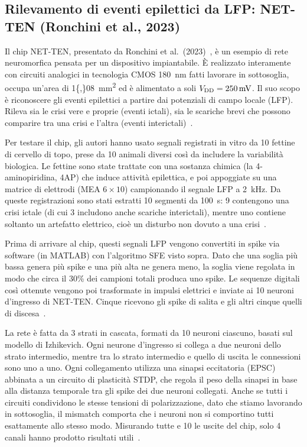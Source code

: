 \subsection{Rilevamento di eventi epilettici da LFP: NET-TEN (Ronchini et al., 2023)}
\label{subsec:netten_app}

Il chip NET-TEN, presentato da Ronchini et al.\ (2023)~\cite{ronchini2023}, è un esempio di rete neuromorfica pensata per un dispositivo impiantabile. È realizzato interamente con circuiti analogici in tecnologia CMOS \SI{180}{\nano\meter} fatti lavorare in sottosoglia, occupa un'area di \SI{1{,}08}{\milli\meter\squared} ed è alimentato a soli $V_{\mathrm{DD}} = \SI{250}{\milli\volt}$. Il suo scopo è riconoscere gli eventi epilettici a partire dai potenziali di campo locale (LFP). Rileva sia le crisi vere e proprie (eventi ictali), sia le scariche brevi che possono comparire tra una crisi e l'altra (eventi interictali)~\cite{ronchini2023}.

Per testare il chip, gli autori hanno usato segnali registrati in vitro da 10 fettine di cervello di topo, prese da 10 animali diversi così da includere la variabilità biologica. Le fettine sono state trattate con una sostanza chimica (la 4-aminopiridina, 4AP) che induce attività epilettica, e poi appoggiate su una matrice di elettrodi (MEA $6\times 10$) campionando il segnale LFP a \SI{2}{\kilo\hertz}. Da queste registrazioni sono stati estratti 10 segmenti da \SI{100}{\second}: 9 contengono una crisi ictale (di cui 3 includono anche scariche interictali), mentre uno contiene soltanto un artefatto elettrico, cioè un disturbo non dovuto a una crisi~\cite{ronchini2023}.

Prima di arrivare al chip, questi segnali LFP vengono convertiti in spike via software (in MATLAB) con l'algoritmo SFE visto sopra. Dato che una soglia più bassa genera più spike e una più alta ne genera meno, la soglia viene regolata in modo che circa il 30\% dei campioni totali produca uno spike. Le sequenze digitali così ottenute vengono poi trasformate in impulsi elettrici e inviate ai 10 neuroni d'ingresso di NET-TEN. Cinque ricevono gli spike di salita e gli altri cinque quelli di discesa~\cite{ronchini2023}.


La rete è fatta da 3 strati in cascata, formati da 10 neuroni ciascuno, basati sul modello di Izhikevich. Ogni neurone d'ingresso si collega a due neuroni dello strato intermedio, mentre tra lo strato intermedio e quello di uscita le connessioni sono uno a uno. Ogni collegamento utilizza una sinapsi eccitatoria (EPSC) abbinata a un circuito di plasticità STDP, che regola il peso della sinapsi in base alla distanza temporale tra gli spike dei due neuroni collegati. Anche se tutti i circuiti condividono le stesse tensioni di polarizzazione, dato che stiamo lavorando in sottosoglia, il mismatch comporta che i neuroni non si comportino tutti esattamente allo stesso modo. Misurando tutte e 10 le uscite del chip, solo 4 canali hanno prodotto risultati utili~\cite{ronchini2023}.

